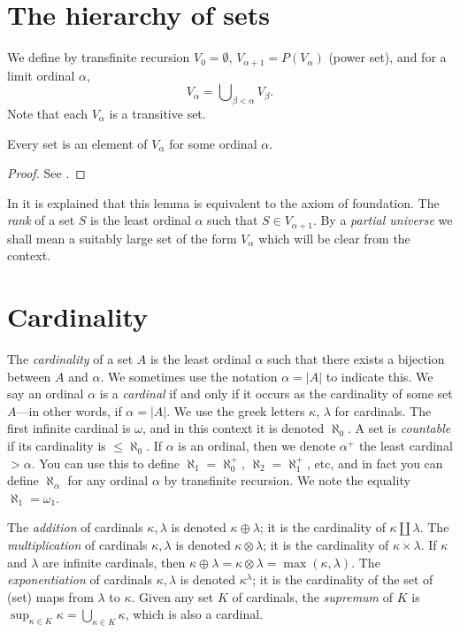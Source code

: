 \section{The hierarchy of sets}
\label{section-sets-hierarchy}

\noindent
We define by transfinite recursion $V_0 = \emptyset$,
$V_{\alpha + 1} = P(V_\alpha)$ (power set),
and for a limit ordinal $\alpha$,
$$
V_\alpha = \bigcup\nolimits_{\beta < \alpha} V_\beta.
$$
Note that each $V_\alpha$ is a transitive set.

\begin{lemma}
\label{lemma-axiom-regularity}
Every set is an element of $V_\alpha$ for some ordinal $\alpha$.
\end{lemma}

\begin{proof}
See \cite[Lemma 6.3]{Jech}.
\end{proof}

\noindent
In \cite[Chapter III]{Kunen} it is explained that this lemma is
equivalent to the axiom of foundation. The {\it rank} of
a set $S$ is the least ordinal $\alpha$ such that $S \in V_{\alpha + 1}$.
By a {\it partial universe} we shall mean a suitably large set of the form
$V_\alpha$ which will be clear from the context.

\section{Cardinality}
\label{section-cardinals}

\noindent
The {\it cardinality} of a set $A$ is the least ordinal $\alpha$
such that there exists a bijection between $A$ and $\alpha$.
We sometimes use the notation $\alpha = |A|$ to indicate this.
We say an ordinal $\alpha$ is a {\it cardinal} if and only
if it occurs as the cardinality of some set $A$---in other words, if
$\alpha = |A|$. We use the greek letters $\kappa$, $\lambda$
for cardinals. The first infinite cardinal is $\omega$, and in this
context it is denoted $\aleph_0$. A set is {\it countable} if its cardinality
is $\leq \aleph_0$. If $\alpha$ is an ordinal, then we denote
$\alpha^+$ the least cardinal $> \alpha$. You can use this to
define $\aleph_1 = \aleph_0^+$, $\aleph_2 = \aleph_1^+$, etc, and
in fact you can define $\aleph_\alpha$ for any ordinal $\alpha$ by
transfinite recursion. We note the equality $\aleph_1 = \omega_1$.

\medskip\noindent
The {\it addition} of cardinals $\kappa, \lambda$
is denoted $\kappa \oplus \lambda$; it is the cardinality of
$\kappa \amalg \lambda$. The {\it multiplication} of cardinals
$\kappa, \lambda$ is denoted $\kappa \otimes \lambda$; it is the
cardinality of $\kappa \times \lambda$. If
$\kappa$ and $\lambda$ are infinite cardinals, then
$\kappa \oplus \lambda = \kappa \otimes \lambda = \max(\kappa, \lambda)$.
The {\it exponentiation}
of cardinals $\kappa, \lambda$ is denoted $\kappa^\lambda$; it is
the cardinality of the set of (set) maps from $\lambda$ to $\kappa$.
Given any set $K$ of cardinals, the {\it supremum} of $K$
is $\sup_{\kappa \in K} \kappa = \bigcup_{\kappa \in K} \kappa$,
which is also a cardinal.


